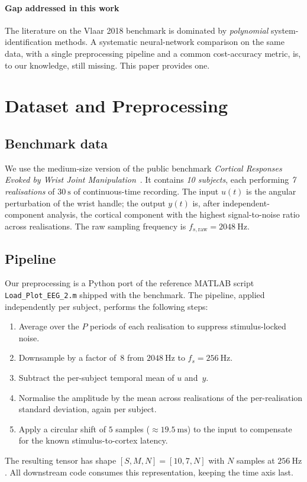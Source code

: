 \documentclass[conference]{IEEEtran}
\begin{document}
\paragraph{Gap addressed in this work}
The literature on the Vlaar 2018 benchmark is dominated by
\emph{polynomial} system-identification methods. A systematic
neural-network comparison on the same data, with a single preprocessing
pipeline and a common cost-accuracy metric, is, to our knowledge, still
missing. This paper provides one.

\section{Dataset and Preprocessing}\label{sec:data}

\subsection{Benchmark data}
We use the medium-size version of the public benchmark
\emph{Cortical Responses Evoked by Wrist Joint
Manipulation}~\cite{Vlaar2018,VlaarDataset}. It contains
\emph{10 subjects}, each performing \emph{7 realisations} of $30~\mathrm{s}$
of continuous-time recording. The input $u(t)$ is the angular
perturbation of the wrist handle; the output $y(t)$ is, after
independent-component analysis, the cortical component with the
highest signal-to-noise ratio across realisations. The raw sampling
frequency is $f_{s,\mathrm{raw}}=2048~\mathrm{Hz}$.

\subsection{Pipeline}
Our preprocessing is a Python port of the reference MATLAB script
\texttt{Load\_Plot\_EEG\_2.m} shipped with the benchmark. The pipeline,
applied independently per subject, performs the following steps:
\begin{enumerate}
    \item Average over the $P$ periods of each realisation to suppress
          stimulus-locked noise.
    \item Downsample by a factor of~$8$ from $2048~\mathrm{Hz}$ to
          $f_s=256~\mathrm{Hz}$.
    \item Subtract the per-subject temporal mean of $u$ and~$y$.
    \item Normalise the amplitude by the mean across realisations of
          the per-realisation standard deviation, again per subject.
    \item Apply a circular shift of $5$ samples ($\approx 19.5~\mathrm{ms}$)
          to the input to compensate for the known stimulus-to-cortex
          latency.
\end{enumerate}
The resulting tensor has shape $[S, M, N]=[10, 7, N]$ with $N$ samples
at $256~\mathrm{Hz}$. All downstream code consumes this representation,
keeping the time axis last.
\end{document}
